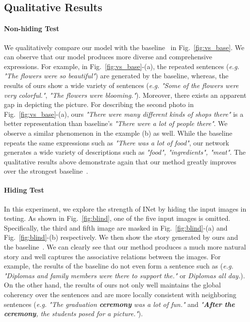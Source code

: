\documentclass[letterpaper]{article} \usepackage{aaai20}  \usepackage{times}  \usepackage{helvet} \usepackage{courier}  \usepackage[hyphens]{url}  \usepackage{graphicx} \urlstyle{rm} \def\UrlFont{\rm}  \usepackage{graphicx}  \frenchspacing  \setlength{\pdfpagewidth}{8.5in}  \setlength{\pdfpageheight}{11in}
\newcommand{\figref}[1]{Fig.~\ref{#1}}
\newcommand{\eg}{{\it e.g. }}
\begin{document}
\subsection{Qualitative Results}

\paragraph{Non-hiding Test}
\quad

\noindent
We qualitatively compare our model with the baseline~\cite{wang2018no} in \figref{fig:vs_base}. We can observe that our model produces more diverse and comprehensive expressions. 
For example, in \figref{fig:vs_base}-(a), the repeated sentences (\eg \textit{"The flowers were so beautiful"}) are generated by the baseline, whereas,  the results of ours show a wide variety of sentences (\eg \textit{"Some of the flowers were very colorful."}, \textit{"The flowers were blooming."}). Moreover, there exists an apparent gap in depicting the picture. For describing the second photo in \figref{fig:vs_base}-(a), ours \textit{"There were many different kinds of shops there"} is a better representation than baseline's \textit{"There were a lot of people there"}. We observe a similar phenomenon in the example (b) as well. While the baseline repeats the same expressions such as \textit{"There was a lot of food"}, our network generates a wide variety of descriptions such as \textit{"food", "ingredients", "meat"}.
The qualitative results above demonstrate again that our method greatly improves over the strongest baseline~\cite{wang2018no}.

\paragraph{Hiding Test}
\quad

\noindent
In this experiment, we explore the strength of INet by hiding the input images in testing.
As shown in \figref{fig:blind}, one of the five input images is omitted. 
Specifically, the third and fifth image are masked in \figref{fig:blind}-(a) and \figref{fig:blind}-(b) respectively.
We then show the story generated by ours and the baseline~\cite{wang2018no}.
We can clearly see that our method produces a much more natural story and well captures the associative relations between the images. For example, the results of the baseline do not even form a sentence such as (\eg \textit{"Diplomas and family members were there to support the."} or \textit{Diplomas all day.}). On the other hand, the results of ours not only well maintains the global coherency over the sentences and are more locally consistent with neighboring sentences (\eg \textit{"The graduation \textbf{ceremony} was a lot of fun."} and \textit{"\textbf{After the ceremony}, the students posed for a picture."}). 
\end{document}
